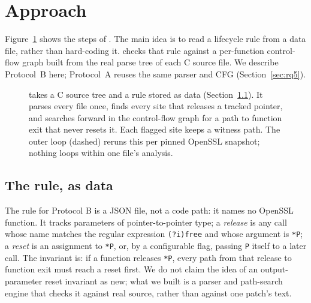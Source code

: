 \section{Approach}
\label{sec:approach}

Figure~\ref{fig:overview} shows the steps of \tool. The main idea is to
read a lifecycle rule from a data file, rather than hard-coding it. \tool
checks that rule against a per-function control-flow graph built from the
real parse tree of each C source file. We describe Protocol~B here; Protocol~A reuses the same parser and CFG
(Section~\ref{sec:rq5}).

\begin{figure}[t]
  \centering
  
  \caption{\tool takes a C source tree and a rule stored as data
    (Section~\ref{sec:rule}). It parses every file once, finds every site
    that releases a tracked pointer, and searches forward in the
    control-flow graph for a path to function exit that never resets it.
    Each flagged site keeps a witness path. The outer loop (dashed) reruns
    this per pinned OpenSSL snapshot; nothing loops within one file's
    analysis.}
  \label{fig:overview}
\end{figure}

\subsection{The rule, as data}
\label{sec:rule}
The rule for Protocol B is a JSON file, not a code path: it names no
OpenSSL function. It tracks parameters of pointer-to-pointer type; a
\emph{release} is any call whose name matches the regular expression
\texttt{(?i)free} and whose argument is \texttt{*P}; a \emph{reset} is an
assignment to \texttt{*P}, or, by a configurable flag, passing \texttt{P}
itself to a later call. The invariant is: if a function releases
\texttt{*P}, every path from that release to function exit must reach a
reset first. We do not claim the idea of an output-parameter reset
invariant as new; what we built is a parser and path-search engine that
checks it against real source, rather than against one patch's text.

